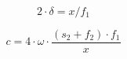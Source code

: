 \begin{equation}
2\cdot\delta = x/f_{1}
\label{eq:Formel_Kleinwinkelnäherung_Michelson}
\end{equation}

\begin{equation}
c = 4\cdot\omega\cdot\dfrac{(s_{2}+f_{2})\cdot f_{1}}{x}
\label{eq:Formel_Lichtgeschwindigkeit_Michelson}
\end{equation}



